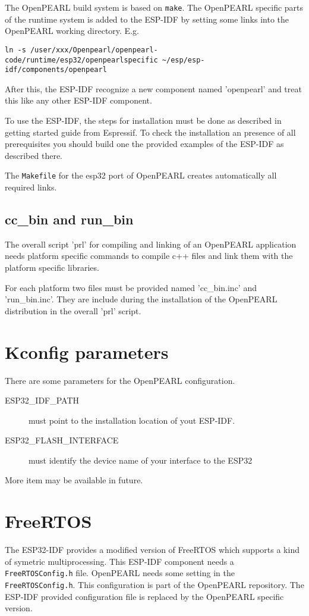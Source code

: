 The OpenPEARL build system is based on \verb|make|.
The OpenPEARL specific parts of the runtime system is added to the ESP-IDF
by setting some links into the OpenPEARL working directory.
E.g.
\begin{lstlisting}[breaklines]
ln -s /user/xxx/Openpearl/openpearl-code/runtime/esp32/openpearlspecific ~/esp/esp-idf/components/openpearl
\end{lstlisting}
After this, the ESP-IDF recognize a new component named 'openpearl' and
 treat this like any other ESP-IDF component.

To use the ESP-IDF, the steps for installation must be done as described in 
getting started guide from Espressif.
To check the installation an presence of all prerequisites you should build
 one the provided examples of the ESP-IDF as described there.

The \verb|Makefile|  for the esp32 port of OpenPEARL creates automatically all
required links.

\subsection{cc\_bin and run\_bin}
The overall script 'prl' for compiling and linking of an OpenPEARL application
needs platform specific commands to compile c++ files and link them with the 
platform specific libraries.

For each platform two files must be provided named 'cc\_bin.inc'
and 'run\_bin.inc'. They are include during the installation of the OpenPEARL
distribution in the overall 'prl' script.

\section{Kconfig parameters}
There are some parameters for the OpenPEARL configuration.
\begin{description}
\item[ESP32\_IDF\_PATH] must point to the installation location of yout ESP-IDF.
\item[ESP32\_FLASH\_INTERFACE] must identify the device name
   of your interface to the ESP32
\end{description}
More item may be available in future.

\section{FreeRTOS}
The ESP32-IDF provides a modified version of FreeRTOS which supports a kind of 
symetric multiprocessing.
This ESP-IDF component needs a \verb|FreeRTOSConfig.h| file.
OpenPEARL needs some setting in the \verb|FreeRTOSConfig.h|. 
This configuration is part of the OpenPEARL repository. The ESP-IDF provided
configuration file is replaced by the OpenPEARL specific version.


